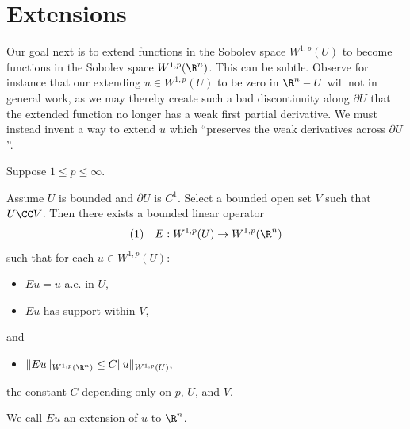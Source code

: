 \section{Extensions}
\label{sec:sobolev-extensions}

Our goal next is to extend functions in the Sobolev space $W^{1,p}(U)$ to become functions in the Sobolev space $W^{1,p}(\R^n)$. This can be subtle. Observe for instance that our extending $u \in W^{1,p}(U)$ to be zero in $\R^n - U$ will not in general work, as we may thereby create such a bad discontinuity along $\partial U$ that the extended function no longer has a weak first partial derivative. We must instead invent a way to extend $u$ which ``preserves the weak derivatives across $\partial U$''.

Suppose $1 \le p \le \infty$.

\begin{theorem}
\label{thm:sobolev-extension-theorem}
Assume $U$ is bounded and $\partial U$ is $C^1$. Select a bounded open set $V$ such that $U \CC V$. Then there exists a bounded linear operator
$$(1) \quad E: W^{1,p}(U) \to W^{1,p}(\R^n)$$
such that for each $u \in W^{1,p}(U)$:
\begin{itemize}
\item[(i)] $Eu = u$ a.e. in $U$,
\item[(ii)] $Eu$ has support within $V$,
\end{itemize}
and
\begin{itemize}
\item[(iii)] $\|Eu\|_{W^{1,p}(\R^n)} \le C\|u\|_{W^{1,p}(U)},$
\end{itemize}
the constant $C$ depending only on $p$, $U$, and $V$.
\end{theorem}

\begin{definition}
\label{def:extension-of-sobolev-function}
We call $Eu$ an extension of $u$ to $\R^n$.
\end{definition}

